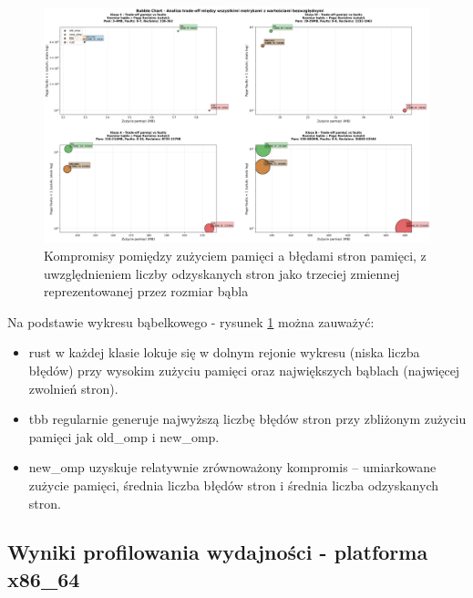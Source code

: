 \begin{figure}[H]
    \centering
    \includegraphics[width=\textwidth]{analiza/images/parallel/is/chart_06_bubble_chart.png}
    \caption{Kompromisy  pomiędzy zużyciem pamięci a błędami stron pamięci, z uwzględnieniem liczby odzyskanych stron jako trzeciej zmiennej reprezentowanej przez rozmiar bąbla}
    \label{is_kompromisy_pamiec_bledy}
\end{figure}
Na podstawie wykresu bąbelkowego - rysunek \ref{is_kompromisy_pamiec_bledy} można zauważyć:
\begin{itemize}
    \item rust w każdej klasie lokuje się w dolnym rejonie wykresu (niska liczba błędów) przy wysokim zużyciu pamięci oraz największych bąblach (najwięcej zwolnień stron).
    \item tbb regularnie generuje najwyższą liczbę błędów stron przy zbliżonym zużyciu pamięci jak old\_omp i new\_omp.
    \item new\_omp uzyskuje relatywnie zrównoważony kompromis – umiarkowane zużycie pamięci, średnia liczba błędów stron i średnia liczba odzyskanych stron.
\end{itemize}
\subsection{Wyniki profilowania wydajności - platforma x86\_64}